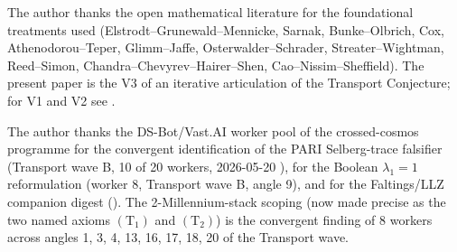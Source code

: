 \documentclass[11pt,a4paper,reqno]{amsart}
\theoremstyle{definition}
\newcommand{\Cone}{(\mathrm{T}_{1})}
\newcommand{\Ctwo}{(\mathrm{T}_{2})}
\begin{document}
The author thanks the open mathematical literature for the
foundational treatments used (Elstrodt--Grunewald--Mennicke,
Sarnak, Bunke--Olbrich, Cox, Athenodorou--Teper, Glimm--Jaffe,
Osterwalder--Schrader, Streater--Wightman, Reed--Simon,
Chandra--Chevyrev--Hairer--Shen, Cao--Nissim--Sheffield). The
present paper is the V3 of an iterative articulation of the
Transport Conjecture; for V1 and V2 see
\cite{Remondiere2026TransportV1, Remondiere2026TransportV2}.

The author thanks the DS-Bot/Vast.AI worker pool of the
crossed-cosmos programme for the convergent identification of the
PARI Selberg-trace falsifier (Transport wave B, 10 of 20 workers,
2026-05-20 \cite{Remondiere2026TransportWaveDigest}), for the
Boolean $\lambda_1 = 1$ reformulation (worker 8, Transport wave B,
angle 9), and for the Faltings/LLZ companion digest
(\cite{Remondiere2026FaltingsLLZDigest}). The 2-Millennium-stack
scoping (now made precise as the two named axioms $\Cone$ and
$\Ctwo$) is the convergent finding of 8 workers across angles 1, 3,
4, 13, 16, 17, 18, 20 of the Transport wave.



\end{document}
